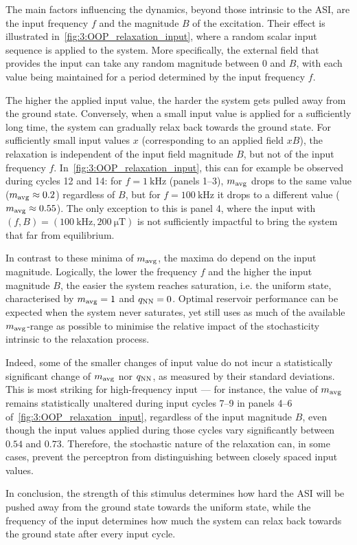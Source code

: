 The main factors influencing the dynamics, beyond those intrinsic to the ASI, are the input frequency $f$ and the magnitude $B$ of the excitation.
Their effect is illustrated in~\cref{fig:3:OOP_relaxation_input}, where a random scalar input sequence is applied to the system.
More specifically, the external field that provides the input can take any random magnitude between 0 and $B$, with each value being maintained for a period determined by the input frequency $f$. \par %
The higher the applied input value, the harder the system gets pulled away from the ground state.
Conversely, when a small input value is applied for a sufficiently long time, the system can gradually relax back towards the ground state.
For sufficiently small input values $x$ (corresponding to an applied field $xB$), the relaxation is independent of the input field magnitude $B$, but not of the input frequency $f$.
In~\cref{fig:3:OOP_relaxation_input}, this can for example be observed during cycles 12 and 14: for $f=\SI{1}{\kilo\hertz}$ (panels 1--3), $m_\mathrm{avg}$ drops to the same value ($m_\mathrm{avg} \approx 0.2$) regardless of $B$, but for $f=\SI{100}{\kilo\hertz}$ it drops to a different value ($m_\mathrm{avg} \approx 0.55$).
The only exception to this is panel 4, where the input with $(f,B)=(\SI{100}{\kilo\hertz}, \SI{200}{\micro\tesla})$ is not sufficiently impactful to bring the system that far from equilibrium. \par
In contrast to these minima of $m_\mathrm{avg}$, the maxima do depend on the input magnitude.
Logically, the lower the frequency $f$ and the higher the input magnitude $B$, the easier the system reaches saturation, i.e. the uniform state, characterised by $m_\mathrm{avg}=1$ and $q_\mathrm{NN}=0$.
Optimal reservoir performance can be expected when the system never saturates, yet still uses as much of the available $m_\mathrm{avg}$-range as possible to minimise the relative impact of the stochasticity intrinsic to the relaxation process. \par
Indeed, some of the smaller changes of input value do not incur a statistically significant change of $m_\mathrm{avg}$ nor $q_\mathrm{NN}$, as measured by their standard deviations.
This is most striking for high-frequency input --- for instance, the value of $m_\mathrm{avg}$ remains statistically unaltered during input cycles 7--9 in panels 4--6 of~\cref{fig:3:OOP_relaxation_input}, regardless of the input magnitude $B$, even though the input values applied during those cycles vary significantly between $0.54$ and $0.73$.
Therefore, the stochastic nature of the relaxation can, in some cases, prevent the perceptron from distinguishing between closely spaced input values. \par
In conclusion, the strength of this stimulus determines how hard the ASI will be pushed away from the ground state towards the uniform state, while the frequency of the input determines how much the system can relax back towards the ground state after every input cycle.

